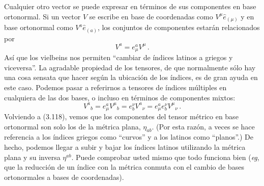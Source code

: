 \documentclass[11pt,b5paper,openany,twoside]{book}
\newcommand{\e}[1]{\hat{e}_{(#1)}}
\begin{document}
Cualquier otro vector se puede expresar en términos de sus componentes en base ortonormal.
Si un vector $V$ se escribe en base de coordenadas como $V^\mu\e\mu$ y en base ortonormal como $V^a\e{a}$, los conjuntos de componentes estarán relacionados por
\begin{equation}
V^a = e^a_\mu V^\mu\,.\label{3.123}
\end{equation}
Así que los vielbeins nos permiten ``cambiar de índices latinos a griegos y viceversa''. La agradable propiedad de los tensores, de que normalmente sólo hay una cosa sensata que hacer según la ubicación de los índices, es de gran ayuda en este caso.
Podemos pasar a referirnos a tensores de índices múltiples en cualquiera de las dos bases, o incluso en términos de componentes mixtos:
\begin{equation}
V^a{}_b = e^a_\mu V^\mu{}_b = e^\nu_b V^a{}_\nu =
e^a_\mu e^\nu_b V^\mu{}_\nu \,.\label{3.124}
\end{equation}
Volviendo a (3.118), vemos que los componentes del tensor métrico en base ortonormal son solo los de la métrica plana, $\eta_{ab}$.
(Por esta razón, a veces se hace referencia a los índices griegos como ``curvos'' y a los latinos como ``planos''.) De hecho, podemos llegar a subir y bajar los índices latinos utilizando la métrica plana y su inversa $\eta^{ab}$.
Puede comprobar usted mismo que todo funciona bien ({\it eg}, que la reducción de un índice con la métrica conmuta con el cambio de bases ortonormales a bases de coordenadas).
\end{document}

